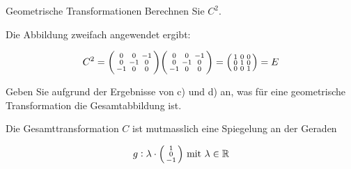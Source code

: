 \begin{example2}{Geometrische Transformationen}
Berechnen Sie $C^{2}$.

Die Abbildung zweifach angewendet ergibt:

$$
C^{2}=\begin{psmallmatrix}
    0 & 0 & -1 \\
    0 & -1 & 0 \\
    -1 & 0 & 0
\end{psmallmatrix} \begin{psmallmatrix}
    0 & 0 & -1 \\
    0 & -1 & 0 \\
    -1 & 0 & 0
\end{psmallmatrix} = \begin{psmallmatrix}
    1 & 0 & 0 \\
    0 & 1 & 0 \\
    0 & 0 & 1
\end{psmallmatrix} = E
$$

Geben Sie aufgrund der Ergebnisse von c) und d) an, was für eine geometrische Transformation die Gesamtabbildung ist.

Die Gesamttransformation $C$ ist mutmasslich eine Spiegelung an der Geraden

$$
g: \lambda \cdot \begin{psmallmatrix}
    1 \\
    0 \\
    -1
\end{psmallmatrix} \text { mit } \lambda \in \mathbb{R}
$$

\end{example2}


